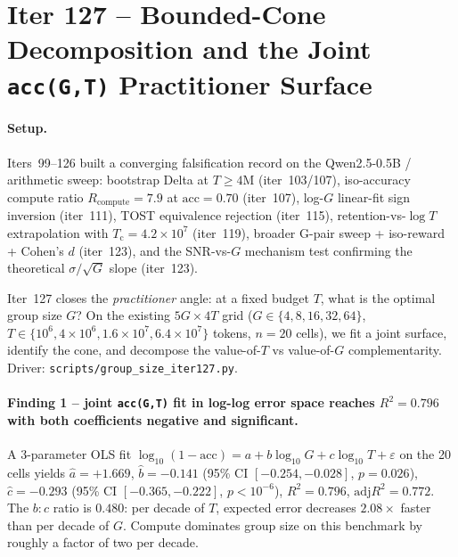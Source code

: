 \section{Iter 127 -- Bounded-Cone Decomposition and the Joint
\texttt{acc(G,T)} Practitioner Surface}
\label{sec:group-size-iter127}

\paragraph{Setup.}
Iters~99--126 built a converging falsification record on the
Qwen2.5-0.5B / arithmetic sweep: bootstrap Delta at $T\ge 4$M
(iter~103/107), iso-accuracy compute ratio $R_{\mathrm{compute}}=7.9$
at $\mathrm{acc}{=}0.70$ (iter~107), log-$G$ linear-fit sign inversion
(iter~111), TOST equivalence rejection (iter~115), retention-vs-$\log T$
extrapolation with $T_{\mathrm{c}}{=}4.2{\times}10^{7}$ (iter~119),
broader G-pair sweep + iso-reward + Cohen's $d$ (iter~123), and the
SNR-vs-$G$ mechanism test confirming the theoretical
$\sigma/\sqrt{G}$ slope (iter~123).

Iter~127 closes the \emph{practitioner} angle: at a fixed budget $T$,
what is the optimal group size $G$? On the existing $5G{\times}4T$
grid ($G \in \{4,8,16,32,64\}$, $T \in \{10^{6}, 4{\times}10^{6},
1.6{\times}10^{7}, 6.4{\times}10^{7}\}$ tokens, $n{=}20$ cells), we
fit a joint surface, identify the cone, and decompose the
value-of-$T$ vs value-of-$G$ complementarity. Driver:
\texttt{scripts/group\_size\_iter127.py}.

\paragraph{Finding 1 -- joint \texttt{acc(G,T)} fit in log-log error
space reaches $R^{2}{=}0.796$ with both coefficients negative and
significant.}
A 3-parameter OLS fit
$\log_{10}(1-\mathrm{acc}) = a + b\log_{10}G + c\log_{10}T + \varepsilon$
on the 20 cells yields
$\hat{a}=+1.669$, $\hat{b}=-0.141$ (95\% CI $[-0.254,-0.028]$,
$p{=}0.026$), $\hat{c}=-0.293$ (95\% CI $[-0.365,-0.222]$,
$p{<}10^{-6}$), $R^{2}=0.796$, $\mathrm{adj}R^{2}=0.772$. The $b{:}c$
ratio is $0.480$: per decade of $T$, expected error decreases
$2.08\times$ faster than per decade of $G$. Compute dominates group
size on this benchmark by roughly a factor of two per decade.

